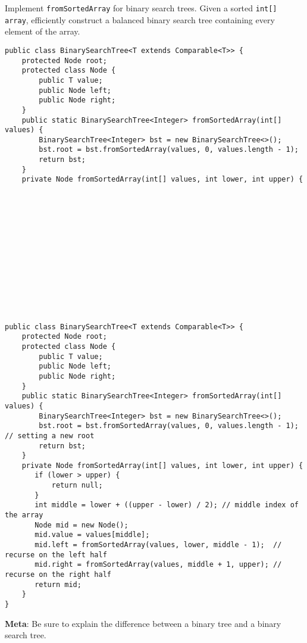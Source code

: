 \begin{blocksection}
\question Implement \lstinline$fromSortedArray$ for binary search trees. Given
a sorted \lstinline$int[] array$, efficiently construct a balanced binary
search tree containing every element of the array.

\ifprintanswers
\else
\begin{lstlisting}
public class BinarySearchTree<T extends Comparable<T>> {
    protected Node root;
    protected class Node {
        public T value;
        public Node left;
        public Node right;
    }
    public static BinarySearchTree<Integer> fromSortedArray(int[] values) {
        BinarySearchTree<Integer> bst = new BinarySearchTree<>();
        bst.root = bst.fromSortedArray(values, 0, values.length - 1);
        return bst;
    }
    private Node fromSortedArray(int[] values, int lower, int upper) {














\end{lstlisting}
\fi

\begin{solution}
\begin{lstlisting}
public class BinarySearchTree<T extends Comparable<T>> {
    protected Node root;
    protected class Node {
        public T value;
        public Node left;
        public Node right;
    }
    public static BinarySearchTree<Integer> fromSortedArray(int[] values) {
        BinarySearchTree<Integer> bst = new BinarySearchTree<>();
        bst.root = bst.fromSortedArray(values, 0, values.length - 1); // setting a new root
        return bst;
    }
    private Node fromSortedArray(int[] values, int lower, int upper) {
       if (lower > upper) {
           return null;
       }
       int middle = lower + ((upper - lower) / 2); // middle index of the array
       Node mid = new Node();
       mid.value = values[middle];
       mid.left = fromSortedArray(values, lower, middle - 1);  // recurse on the left half
       mid.right = fromSortedArray(values, middle + 1, upper); // recurse on the right half
       return mid;
    }
}
\end{lstlisting}

\textbf{Meta}: Be sure to explain the difference between a binary tree and a
    binary search tree.
\end{solution}
\end{blocksection}
